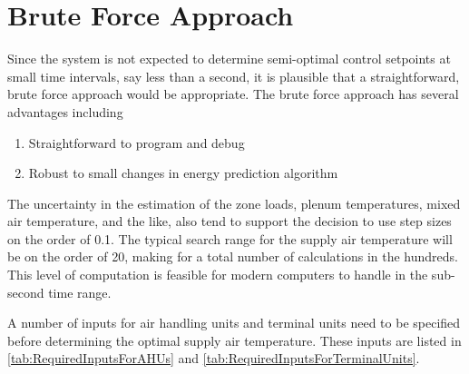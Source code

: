 
\section{Brute Force Approach}

Since the system is not expected to determine semi-optimal
control setpoints at small time intervals, say less than a second, it is
plausible that a straightforward, brute force approach would be
appropriate.  The brute force approach has several advantages including
\begin{enumerate}
        \item Straightforward to program and debug
        \item Robust to small changes in energy prediction algorithm
\end{enumerate}

The uncertainty in the estimation of the zone loads, plenum
temperatures, mixed air temperature, and the like, also tend to support
the decision to use step sizes on the order of  \SI{0.1}{\degreeF}. The
typical search range for the supply air temperature will be on the order
of \SI{20}{\degreeF}, making for a total number of calculations in the
hundreds.  This level of computation is feasible for modern
computers to handle in the sub-second time range.

A number of inputs for air handling units and terminal units need to be
specified before determining the optimal supply air temperature. These
inputs are listed in \tableref{} \ref{tab:RequiredInputsForAHUs} and
\ref{tab:RequiredInputsForTerminalUnits}.

